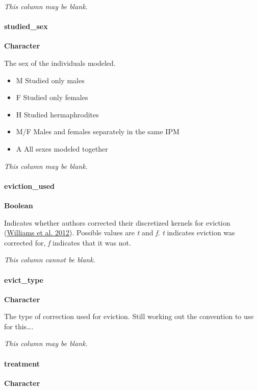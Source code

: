\documentclass[]{article}
\let\oldparagraph\paragraph
\renewcommand{\paragraph}[1]{\oldparagraph{#1}\mbox{}}
\begin{document}
\emph{This column may be blank.}

\paragraph{studied\_sex}\label{studied_sex}

\textbf{Character}

The sex of the individuals modeled.

\begin{itemize}
\item
  M Studied only males
\item
  F Studied only females
\item
  H Studied hermaphrodites
\item
  M/F Males and females separately in the same IPM
\item
  A All sexes modeled together
\end{itemize}

\emph{This column may be blank.}

\paragraph{eviction\_used}\label{eviction_used}

\textbf{Boolean}

Indicates whether authors corrected their discretized kernels for
eviction
(\href{https://scholarship.rice.edu/bitstream/handle/1911/69874/Avoiding\%20unintentional\%20eviction.pdf?sequence=1}{Williams
et al. 2012}). Possible values are \emph{t} and \emph{f}. \emph{t}
indicates eviction was corrected for, \emph{f} indicates that it was
not.

\emph{This column cannot be blank.}

\paragraph{evict\_type}\label{evict_type}

\textbf{Character}

The type of correction used for eviction. Still working out the
convention to use for this\ldots{}.

\emph{This column may be blank.}

\paragraph{treatment}\label{treatment}

\textbf{Character}
\end{document}
